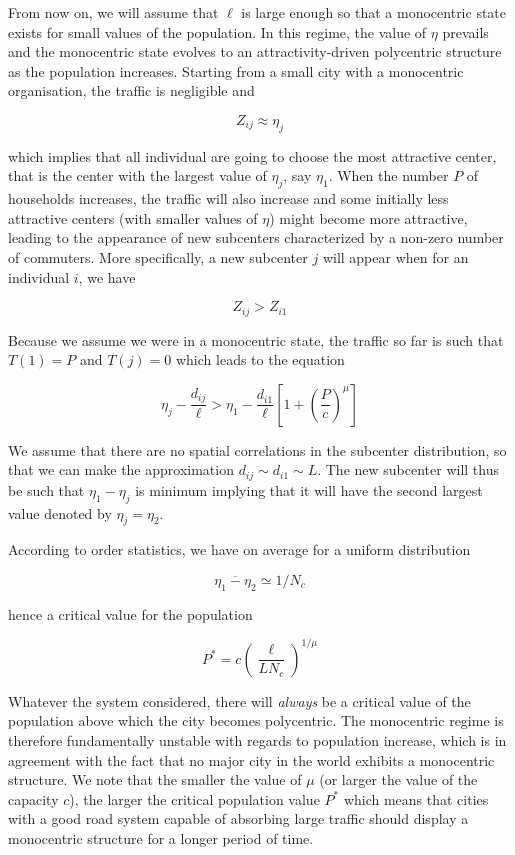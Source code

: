 From now on, we will assume that $\ell$ is large enough so that a
monocentric state exists for small values of the population. In this
regime, the value of $\eta$ prevails and the monocentric state evolves
to an attractivity-driven polycentric structure as the population
increases. 
Starting from a small city with a monocentric
organisation, the traffic is negligible and 

$$Z_{ij}\approx \eta_j$$

which implies that all individual are going to choose the most attractive
center, that is the center with the largest value of $\eta_j$, say $\eta_1$.
When the number $P$ of households increases, the traffic will also increase and
some initially less attractive centers (with smaller values of $\eta$) might
become more attractive, leading to the appearance of new subcenters
characterized by a non-zero number of commuters. More specifically, a new
subcenter $j$ will appear when for an individual $i$, we have 

$$Z_{ij}>Z_{i1}$$

Because we assume we were in a monocentric state, the traffic so far is such
that $T(1)=P$ and $T(j)=0$ which leads to the equation

\begin{equation}
    \eta_j-\frac{d_{ij}}{\ell}>\eta_1-\frac{d_{i1}}{\ell}\left[1+\left(\frac{P}{c}\right)^\mu\right]
\end{equation}

We assume that there are no spatial correlations in the subcenter distribution,
so that we can make the approximation $d_{ij}\sim d_{i1}\sim L$. The new
subcenter will thus be such that $\eta_1-\eta_j$ is minimum implying that it
will have the second largest value denoted by $\eta_j=\eta_2$. 

According to order statistics, we have on average for a uniform distribution

$$\overline{\eta_1-\eta_2}\simeq 1/N_c$$

hence a critical value for the population

\begin{equation}
    \boxed{P^*= c \left( \frac{\ell}{L N_c} \right)^{1/\mu}}
    \label{eq:critical_population}
\end{equation}

Whatever the system considered, there will \emph{always} be a critical
value of the population above which the city becomes polycentric. The
monocentric regime is therefore fundamentally unstable with regards to
population increase, which is in agreement with the fact that no major city in
the world exhibits a monocentric structure. We note that the smaller the value
of $\mu$ (or larger the value of the capacity $c$), the larger the critical
population value $P^*$ which means that cities with a good road system capable
of absorbing large traffic should display a monocentric structure for a longer
period of time.

